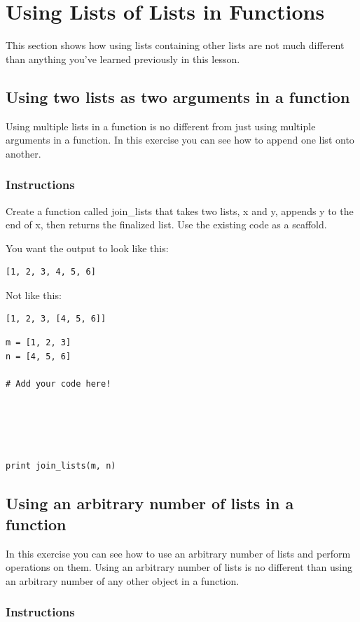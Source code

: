 \documentclass[12pt,a4paper,final,twoside,onecolumn,titlepage]{book}
\begin{document}
\section{Using Lists of Lists in Functions}
This section shows how using lists containing other lists are not much different than anything you've learned previously in this lesson.
\subsection{Using two lists as two arguments in a function}

Using multiple lists in a function is no different from just using multiple arguments in a function. In this exercise you can see how to append one list onto another.
\subsubsection{Instructions}

Create a function called join\_lists that takes two lists, x and y, appends y to the end of x, then returns the finalized list. Use the existing code as a scaffold.

You want the output to look like this:
\begin{lstlisting}
[1, 2, 3, 4, 5, 6]
\end{lstlisting}
Not like this:
\begin{lstlisting}
[1, 2, 3, [4, 5, 6]]
\end{lstlisting}

\begin{lstlisting}
m = [1, 2, 3]
n = [4, 5, 6]

# Add your code here!





print join_lists(m, n)
\end{lstlisting}

\subsection{Using an arbitrary number of lists in a function}

In this exercise you can see how to use an arbitrary number of lists and perform operations on them. Using an arbitrary number of lists is no different than using an arbitrary number of any other object in a function.
\subsubsection{Instructions}
\end{document}
